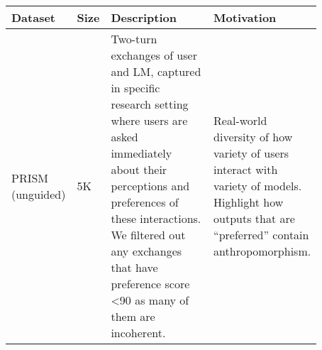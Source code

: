 \documentclass[11pt]{article}
\begin{document}
\begin{table*}[th]
\scriptsize
\begin{tabular}{|p{0.15\linewidth}|p{0.02\linewidth}|p{0.35\linewidth}|p{0.35\linewidth}|}\hline
\textbf{Dataset}                                                    & \textbf{Size} & \textbf{Description}                         & \textbf{Motivation}          \\\hline
PRISM (unguided) \cite{kirk2025prism}                                                    & 5K   & Two-turn exchanges of user and LM, captured in specific research setting where users are asked immediately about their perceptions and preferences of these interactions. We filtered out any exchanges that have preference score \textless 90 as many of them are incoherent.                           & Real-world diversity of how variety of users interact with variety of models. Highlight how outputs that are ``preferred'' contain anthropomorphism.                      \\\hline


\end{tabular}
\end{table*}
\end{document}
